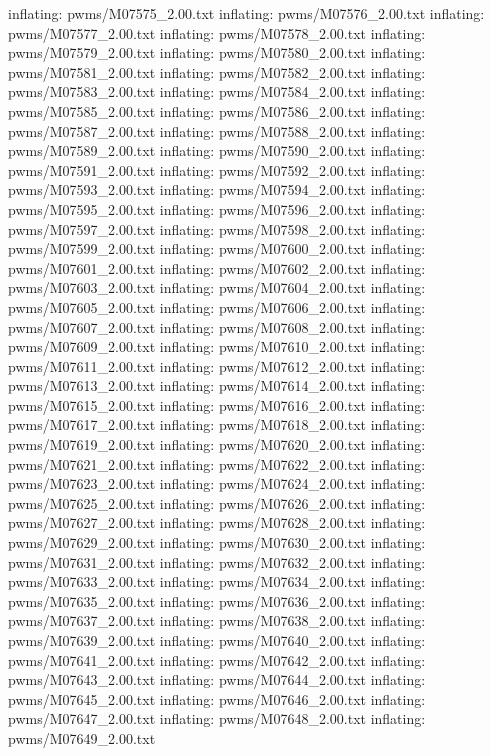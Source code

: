 \documentclass[letterpaper,10pt,english]{sphinxmanual}
\begin{document}
{\begin{sphinxVerbatim}[commandchars=\\\{\}]
  inflating: pwms/M07575\_2.00.txt
  inflating: pwms/M07576\_2.00.txt
  inflating: pwms/M07577\_2.00.txt
  inflating: pwms/M07578\_2.00.txt
  inflating: pwms/M07579\_2.00.txt
  inflating: pwms/M07580\_2.00.txt
  inflating: pwms/M07581\_2.00.txt
  inflating: pwms/M07582\_2.00.txt
  inflating: pwms/M07583\_2.00.txt
  inflating: pwms/M07584\_2.00.txt
  inflating: pwms/M07585\_2.00.txt
  inflating: pwms/M07586\_2.00.txt
  inflating: pwms/M07587\_2.00.txt
  inflating: pwms/M07588\_2.00.txt
  inflating: pwms/M07589\_2.00.txt
  inflating: pwms/M07590\_2.00.txt
  inflating: pwms/M07591\_2.00.txt
  inflating: pwms/M07592\_2.00.txt
  inflating: pwms/M07593\_2.00.txt
  inflating: pwms/M07594\_2.00.txt
  inflating: pwms/M07595\_2.00.txt
  inflating: pwms/M07596\_2.00.txt
  inflating: pwms/M07597\_2.00.txt
  inflating: pwms/M07598\_2.00.txt
  inflating: pwms/M07599\_2.00.txt
  inflating: pwms/M07600\_2.00.txt
  inflating: pwms/M07601\_2.00.txt
  inflating: pwms/M07602\_2.00.txt
  inflating: pwms/M07603\_2.00.txt
  inflating: pwms/M07604\_2.00.txt
  inflating: pwms/M07605\_2.00.txt
  inflating: pwms/M07606\_2.00.txt
  inflating: pwms/M07607\_2.00.txt
  inflating: pwms/M07608\_2.00.txt
  inflating: pwms/M07609\_2.00.txt
  inflating: pwms/M07610\_2.00.txt
  inflating: pwms/M07611\_2.00.txt
  inflating: pwms/M07612\_2.00.txt
  inflating: pwms/M07613\_2.00.txt
  inflating: pwms/M07614\_2.00.txt
  inflating: pwms/M07615\_2.00.txt
  inflating: pwms/M07616\_2.00.txt
  inflating: pwms/M07617\_2.00.txt
  inflating: pwms/M07618\_2.00.txt
  inflating: pwms/M07619\_2.00.txt
  inflating: pwms/M07620\_2.00.txt
  inflating: pwms/M07621\_2.00.txt
  inflating: pwms/M07622\_2.00.txt
  inflating: pwms/M07623\_2.00.txt
  inflating: pwms/M07624\_2.00.txt
  inflating: pwms/M07625\_2.00.txt
  inflating: pwms/M07626\_2.00.txt
  inflating: pwms/M07627\_2.00.txt
  inflating: pwms/M07628\_2.00.txt
  inflating: pwms/M07629\_2.00.txt
  inflating: pwms/M07630\_2.00.txt
  inflating: pwms/M07631\_2.00.txt
  inflating: pwms/M07632\_2.00.txt
  inflating: pwms/M07633\_2.00.txt
  inflating: pwms/M07634\_2.00.txt
  inflating: pwms/M07635\_2.00.txt
  inflating: pwms/M07636\_2.00.txt
  inflating: pwms/M07637\_2.00.txt
  inflating: pwms/M07638\_2.00.txt
  inflating: pwms/M07639\_2.00.txt
  inflating: pwms/M07640\_2.00.txt
  inflating: pwms/M07641\_2.00.txt
  inflating: pwms/M07642\_2.00.txt
  inflating: pwms/M07643\_2.00.txt
  inflating: pwms/M07644\_2.00.txt
  inflating: pwms/M07645\_2.00.txt
  inflating: pwms/M07646\_2.00.txt
  inflating: pwms/M07647\_2.00.txt
  inflating: pwms/M07648\_2.00.txt
  inflating: pwms/M07649\_2.00.txt

\end{sphinxVerbatim}}
\end{document}
